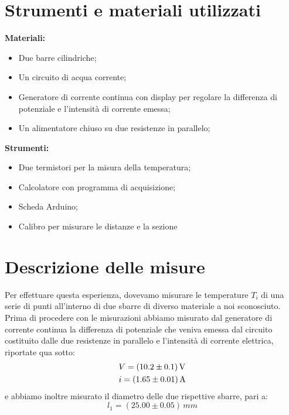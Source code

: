 \documentclass{article}
\begin{document}
\section{Strumenti e materiali utilizzati}

\textbf{Materiali:}
\begin{itemize}
	\item Due barre cilindriche;
	\item Un circuito di acqua corrente;
	\item Generatore di corrente continua con display per regolare la differenza di potenziale e l'intensità di corrente emessa;
	\item Un alimentatore chiuso su due resistenze in parallelo;
\end{itemize}
\textbf{Strumenti:}
\begin{itemize}
	\item Due termistori per la misura della temperatura;
	\item Calcolatore con programma di acquisizione;
	\item Scheda Arduino;
	\item Calibro per misurare le distanze e la sezione
\end{itemize}
\section{Descrizione delle misure}

Per effettuare questa esperienza, dovevamo misurare le temperature $T_i$ di una serie di punti all'interno di due sbarre di diverso materiale a noi sconosciuto. \\
Prima di procedere con le misurazioni abbiamo misurato dal generatore di corrente continua la differenza di potenziale che veniva emessa dal circuito costituito dalle due resistenze in parallelo e l'intensità di corrente elettrica, riportate qua sotto:
\begin{align*}
	&V = (10.2 \pm 0.1) \, \text{\unit{V}} \\
	&i = (1.65 \pm 0.01) \, \text{\unit{A}}
\end{align*}
e abbiamo inoltre misurato il diametro delle due rispettive sbarre, pari a:
\begin{equation*}
	l_1  = (25.00 \pm 0.05) \, \unit{mm}
\end{equation*}
\end{document}
